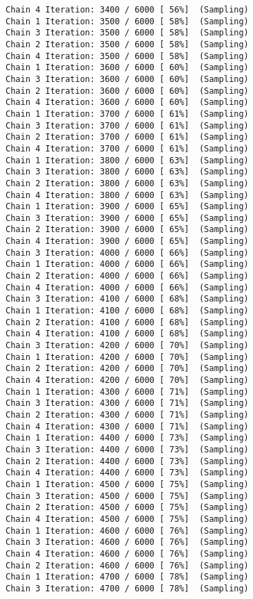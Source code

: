 \documentclass[
  letterpaper,
]{article}
\begin{document}
\begin{verbatim}
Chain 4 Iteration: 3400 / 6000 [ 56%]  (Sampling) 
Chain 1 Iteration: 3500 / 6000 [ 58%]  (Sampling) 
Chain 3 Iteration: 3500 / 6000 [ 58%]  (Sampling) 
Chain 2 Iteration: 3500 / 6000 [ 58%]  (Sampling) 
Chain 4 Iteration: 3500 / 6000 [ 58%]  (Sampling) 
Chain 1 Iteration: 3600 / 6000 [ 60%]  (Sampling) 
Chain 3 Iteration: 3600 / 6000 [ 60%]  (Sampling) 
Chain 2 Iteration: 3600 / 6000 [ 60%]  (Sampling) 
Chain 4 Iteration: 3600 / 6000 [ 60%]  (Sampling) 
Chain 1 Iteration: 3700 / 6000 [ 61%]  (Sampling) 
Chain 3 Iteration: 3700 / 6000 [ 61%]  (Sampling) 
Chain 2 Iteration: 3700 / 6000 [ 61%]  (Sampling) 
Chain 4 Iteration: 3700 / 6000 [ 61%]  (Sampling) 
Chain 1 Iteration: 3800 / 6000 [ 63%]  (Sampling) 
Chain 3 Iteration: 3800 / 6000 [ 63%]  (Sampling) 
Chain 2 Iteration: 3800 / 6000 [ 63%]  (Sampling) 
Chain 4 Iteration: 3800 / 6000 [ 63%]  (Sampling) 
Chain 1 Iteration: 3900 / 6000 [ 65%]  (Sampling) 
Chain 3 Iteration: 3900 / 6000 [ 65%]  (Sampling) 
Chain 2 Iteration: 3900 / 6000 [ 65%]  (Sampling) 
Chain 4 Iteration: 3900 / 6000 [ 65%]  (Sampling) 
Chain 3 Iteration: 4000 / 6000 [ 66%]  (Sampling) 
Chain 1 Iteration: 4000 / 6000 [ 66%]  (Sampling) 
Chain 2 Iteration: 4000 / 6000 [ 66%]  (Sampling) 
Chain 4 Iteration: 4000 / 6000 [ 66%]  (Sampling) 
Chain 3 Iteration: 4100 / 6000 [ 68%]  (Sampling) 
Chain 1 Iteration: 4100 / 6000 [ 68%]  (Sampling) 
Chain 2 Iteration: 4100 / 6000 [ 68%]  (Sampling) 
Chain 4 Iteration: 4100 / 6000 [ 68%]  (Sampling) 
Chain 3 Iteration: 4200 / 6000 [ 70%]  (Sampling) 
Chain 1 Iteration: 4200 / 6000 [ 70%]  (Sampling) 
Chain 2 Iteration: 4200 / 6000 [ 70%]  (Sampling) 
Chain 4 Iteration: 4200 / 6000 [ 70%]  (Sampling) 
Chain 1 Iteration: 4300 / 6000 [ 71%]  (Sampling) 
Chain 3 Iteration: 4300 / 6000 [ 71%]  (Sampling) 
Chain 2 Iteration: 4300 / 6000 [ 71%]  (Sampling) 
Chain 4 Iteration: 4300 / 6000 [ 71%]  (Sampling) 
Chain 1 Iteration: 4400 / 6000 [ 73%]  (Sampling) 
Chain 3 Iteration: 4400 / 6000 [ 73%]  (Sampling) 
Chain 2 Iteration: 4400 / 6000 [ 73%]  (Sampling) 
Chain 4 Iteration: 4400 / 6000 [ 73%]  (Sampling) 
Chain 1 Iteration: 4500 / 6000 [ 75%]  (Sampling) 
Chain 3 Iteration: 4500 / 6000 [ 75%]  (Sampling) 
Chain 2 Iteration: 4500 / 6000 [ 75%]  (Sampling) 
Chain 4 Iteration: 4500 / 6000 [ 75%]  (Sampling) 
Chain 1 Iteration: 4600 / 6000 [ 76%]  (Sampling) 
Chain 3 Iteration: 4600 / 6000 [ 76%]  (Sampling) 
Chain 4 Iteration: 4600 / 6000 [ 76%]  (Sampling) 
Chain 2 Iteration: 4600 / 6000 [ 76%]  (Sampling) 
Chain 1 Iteration: 4700 / 6000 [ 78%]  (Sampling) 
Chain 3 Iteration: 4700 / 6000 [ 78%]  (Sampling) 

\end{verbatim}
\end{document}
